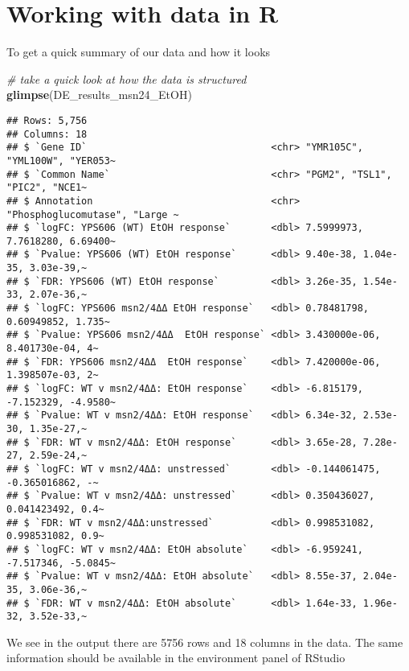 \documentclass[
]{book}
\newenvironment{Shaded}{\begin{snugshade}}{\end{snugshade}}
\newcommand{\CommentTok}[1]{\textcolor[rgb]{0.56,0.35,0.01}{\textit{#1}}}
\newcommand{\FunctionTok}[1]{\textcolor[rgb]{0.13,0.29,0.53}{\textbf{#1}}}
\newcommand{\NormalTok}[1]{#1}
\theoremstyle{definition}
\theoremstyle{definition}
\theoremstyle{definition}
\theoremstyle{definition}
\theoremstyle{remark}
\begin{document}
\hypertarget{working-with-data-in-r}{%
\section{Working with data in R}\label{working-with-data-in-r}}

To get a quick summary of our data and how it looks

\begin{Shaded}
\begin{Highlighting}[]
\CommentTok{\# take a quick look at how the data is structured}
\FunctionTok{glimpse}\NormalTok{(DE\_results\_msn24\_EtOH)}
\end{Highlighting}
\end{Shaded}

\begin{verbatim}
## Rows: 5,756
## Columns: 18
## $ `Gene ID`                                <chr> "YMR105C", "YML100W", "YER053~
## $ `Common Name`                            <chr> "PGM2", "TSL1", "PIC2", "NCE1~
## $ Annotation                               <chr> "Phosphoglucomutase", "Large ~
## $ `logFC: YPS606 (WT) EtOH response`       <dbl> 7.5999973, 7.7618280, 6.69400~
## $ `Pvalue: YPS606 (WT) EtOH response`      <dbl> 9.40e-38, 1.04e-35, 3.03e-39,~
## $ `FDR: YPS606 (WT) EtOH response`         <dbl> 3.26e-35, 1.54e-33, 2.07e-36,~
## $ `logFC: YPS606 msn2/4ΔΔ EtOH response`   <dbl> 0.78481798, 0.60949852, 1.735~
## $ `Pvalue: YPS606 msn2/4ΔΔ  EtOH response` <dbl> 3.430000e-06, 8.401730e-04, 4~
## $ `FDR: YPS606 msn2/4ΔΔ  EtOH response`    <dbl> 7.420000e-06, 1.398507e-03, 2~
## $ `logFC: WT v msn2/4ΔΔ: EtOH response`    <dbl> -6.815179, -7.152329, -4.9580~
## $ `Pvalue: WT v msn2/4ΔΔ: EtOH response`   <dbl> 6.34e-32, 2.53e-30, 1.35e-27,~
## $ `FDR: WT v msn2/4ΔΔ: EtOH response`      <dbl> 3.65e-28, 7.28e-27, 2.59e-24,~
## $ `logFC: WT v msn2/4ΔΔ: unstressed`       <dbl> -0.144061475, -0.365016862, -~
## $ `Pvalue: WT v msn2/4ΔΔ: unstressed`      <dbl> 0.350436027, 0.041423492, 0.4~
## $ `FDR: WT v msn2/4ΔΔ:unstressed`          <dbl> 0.998531082, 0.998531082, 0.9~
## $ `logFC: WT v msn2/4ΔΔ: EtOH absolute`    <dbl> -6.959241, -7.517346, -5.0845~
## $ `Pvalue: WT v msn2/4ΔΔ: EtOH absolute`   <dbl> 8.55e-37, 2.04e-35, 3.06e-36,~
## $ `FDR: WT v msn2/4ΔΔ: EtOH absolute`      <dbl> 1.64e-33, 1.96e-32, 3.52e-33,~
\end{verbatim}

We see in the output there are 5756 rows and 18 columns in the data. The same information should be available in the environment panel of RStudio
\end{document}
